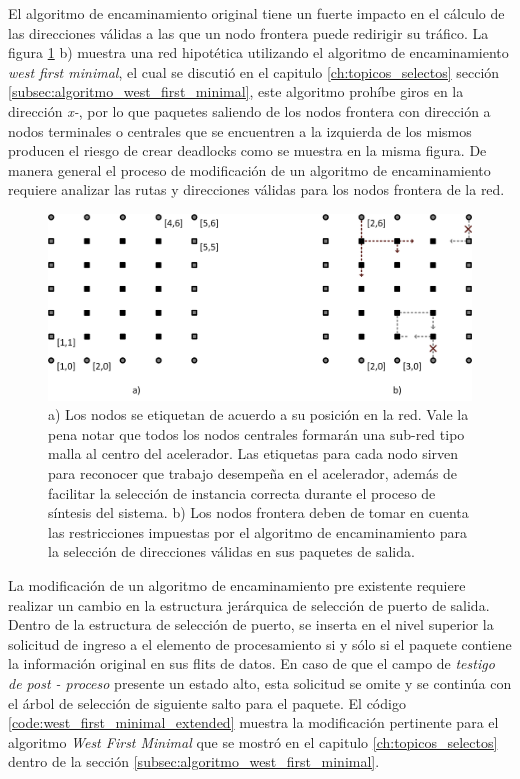 El algoritmo de encaminamiento original tiene un fuerte impacto en el cálculo de las direcciones válidas a las que un nodo frontera puede redirigir su tráfico. La figura \ref{fig:ch5_direccionamiento} b) muestra una red hipotética utilizando el algoritmo de encaminamiento \textit{west first minimal}, el cual se discutió en el capitulo \ref{ch:topicos_selectos} sección \ref{subsec:algoritmo_west_first_minimal}, este algoritmo prohíbe giros en la dirección \textit{x-}, por lo que paquetes saliendo de los nodos frontera con dirección a nodos terminales o centrales que se encuentren a la izquierda de los mismos producen el riesgo de crear deadlocks como se muestra en la misma figura. De manera general el proceso de modificación de un algoritmo de encaminamiento requiere analizar las rutas y direcciones válidas para los nodos frontera de la red.

\begin{figure}
	\begin{center}
		\includegraphics[scale=0.6]{figures/ch5_direccionamiento.png}
	\end{center}
	\caption
		{	
			a) Los nodos se etiquetan de acuerdo a su posición en la red. Vale la pena notar que todos los nodos centrales formarán una sub-red tipo malla al centro del acelerador. Las etiquetas para cada nodo sirven para reconocer que trabajo desempeña en el acelerador, además de facilitar la selección de instancia correcta durante el proceso de síntesis del sistema. b) Los nodos frontera deben de tomar en cuenta las restricciones impuestas por el algoritmo de encaminamiento para la selección de direcciones válidas en sus paquetes de salida.
		}
	\label{fig:ch5_direccionamiento}
\end{figure}

La modificación de un algoritmo de encaminamiento pre existente requiere realizar un cambio en la estructura jerárquica de selección de puerto de salida. Dentro de la estructura de selección de puerto, se inserta en el nivel superior la solicitud de ingreso a el elemento de procesamiento si y sólo si el paquete contiene la información original en sus flits de datos. En caso de que el campo de \textit{testigo de post - proceso} presente un estado alto, esta solicitud se omite y se continúa con el árbol de selección de siguiente salto para el paquete. El código \ref{code:west_first_minimal_extended} muestra la modificación pertinente para el algoritmo \textit{West First Minimal} que se mostró en el capitulo \ref{ch:topicos_selectos} dentro de la sección \ref{subsec:algoritmo_west_first_minimal}.


